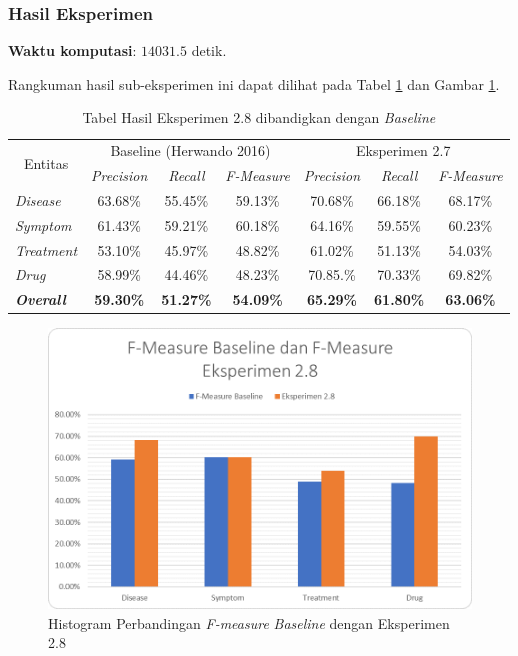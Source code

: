 	\subsubsection{Hasil Eksperimen}
	\textbf{Waktu komputasi}: $ 14031.5 $ detik.
	
	Rangkuman hasil sub-eksperimen ini dapat dilihat pada Tabel \ref{table:owndict8} dan Gambar \ref{fig:owndict8}.
	
	\begin{table}
		\centering
		\caption{Tabel Hasil Eksperimen 2.8 dibandigkan dengan \textit{Baseline}}
		\begin{tabular}{|l|c|c|c|c|c|c|}
			\hline
			\multicolumn{1}{|c|}{\multirow{2}{*}{Entitas}} & \multicolumn{3}{c|}{Baseline (Herwando 2016)} & \multicolumn{3}{c|}{Eksperimen 2.7} \\ \cline{2-7} 
			\multicolumn{1}{|c|}{} & \textit{Precision} & \textit{Recall} & \textit{F-Measure} & \textit{Precision} & \textit{Recall} & \textit{F-Measure} \\ \hline
			\textit{Disease} & 63.68\% & 55.45\% & 59.13\% & 70.68\% & 66.18\% & 68.17\% \\ \hline
			\textit{Symptom} & 61.43\% & 59.21\% & 60.18\% & 64.16\% & 59.55\% & 60.23\% \\ \hline
			\textit{Treatment} & 53.10\% & 45.97\% & 48.82\% & 61.02\% & 51.13\% & 54.03\% \\ \hline
			\textit{Drug} & 58.99\% & 44.46\% & 48.23\% & 70.85.\% & 70.33\% & 69.82\% \\ \hline
			\textit{\textbf{Overall}} & \textbf{59.30\%} & \textbf{51.27\%} & \textbf{54.09\%} & \textbf{65.29\%} & \textbf{61.80\%} & \textbf{63.06\%} \\ \hline
		\end{tabular}
		\label{table:owndict8}
	\end{table}
	
	\begin{figure}
		\centering
		\includegraphics[width=0.85\linewidth]{images/histogram8}
		\caption{Histogram Perbandingan \textit{F-measure} \textit{Baseline} dengan Eksperimen 2.8}
		\label{fig:owndict8}
	\end{figure}
	
